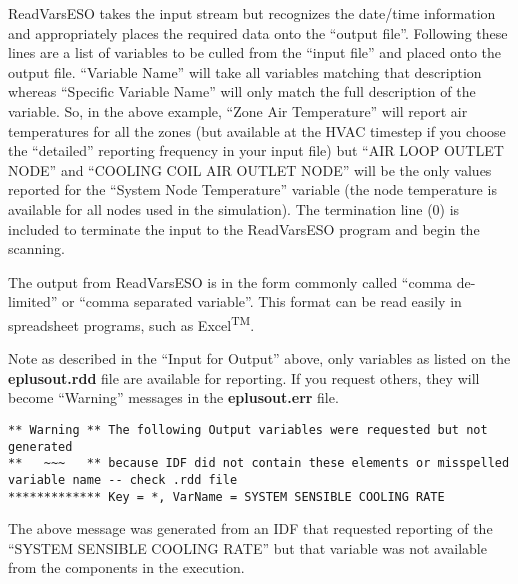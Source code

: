 ReadVarsESO takes the input stream but recognizes the date/time information and appropriately places the required data onto the ``output file''. Following these lines are a list of variables to be culled from the ``input file'' and placed onto the output file. ``Variable Name'' will take all variables matching that description whereas ``Specific Variable Name'' will only match the full description of the variable. So, in the above example, ``Zone Air Temperature'' will report air temperatures for all the zones (but available at the HVAC timestep if you choose the ``detailed'' reporting frequency in your input file) but ``AIR LOOP OUTLET NODE'' and ``COOLING COIL AIR OUTLET NODE'' will be the only values reported for the ``System Node Temperature'' variable (the node temperature is available for all nodes used in the simulation). The termination line (0) is included to terminate the input to the ReadVarsESO program and begin the scanning.

The output from ReadVarsESO is in the form commonly called ``comma de-limited'' or ``comma separated variable''. This format can be read easily in spreadsheet programs, such as Excel\textsuperscript{TM}.

Note as described in the ``Input for Output'' above, only variables as listed on the \textbf{eplusout.rdd} file are available for reporting. If you request others, they will become ``Warning'' messages in the \textbf{eplusout.err} file.

\begin{lstlisting}
** Warning ** The following Output variables were requested but not generated
**   ~~~   ** because IDF did not contain these elements or misspelled variable name -- check .rdd file
************* Key = *, VarName = SYSTEM SENSIBLE COOLING RATE
\end{lstlisting}

The above message was generated from an IDF that requested reporting of the ``SYSTEM SENSIBLE COOLING RATE'' but that variable was not available from the components in the execution.


